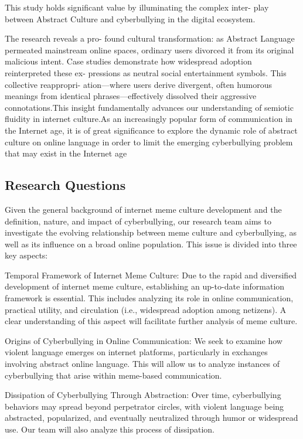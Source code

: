 \documentclass[12pt,a4paper]{ctexart}
\begin{document}
This  study  holds  significant value by  illuminating the  complex  inter- play between Abstract Culture and cyberbullying in the digital ecosystem.


The research reveals a pro- found cultural transformation: as Abstract Language permeated mainstream online spaces, ordinary users divorced it from its original malicious intent. Case studies demonstrate how widespread adoption reinterpreted these ex- pressions as neutral social entertainment symbols. This collective reappropri- ation—where users derive divergent, often humorous meanings from identical phrases—effectively dissolved their aggressive connotations.This insight fundamentally advances our understanding of semiotic fluidity in internet culture.As an increasingly popular form of communication in the Internet age, it is of great significance to explore the dynamic role of abstract culture on online language in order to limit the emerging cyberbullying problem that may exist in the Internet age

\subsection{Research Questions}

Given the general background of internet meme culture development and the definition, nature, and impact of cyberbullying, our research team aims to investigate the evolving relationship between meme culture and cyberbullying, as well as its influence on a broad online population. This issue is divided into three key aspects:

Temporal Framework of Internet Meme Culture: Due to the rapid and diversified development of internet meme culture, establishing an up-to-date information framework is essential. This includes analyzing its role in online communication, practical utility, and circulation (i.e., widespread adoption among netizens). A clear understanding of this aspect will facilitate further analysis of meme culture.

Origins of Cyberbullying in Online Communication: We seek to examine how violent language emerges on internet platforms, particularly in exchanges involving abstract online language. This will allow us to analyze instances of cyberbullying that arise within meme-based communication.

Dissipation of Cyberbullying Through Abstraction: Over time, cyberbullying behaviors may spread beyond perpetrator circles, with violent language being abstracted, popularized, and eventually neutralized through humor or widespread use. Our team will also analyze this process of dissipation.
\end{document}
